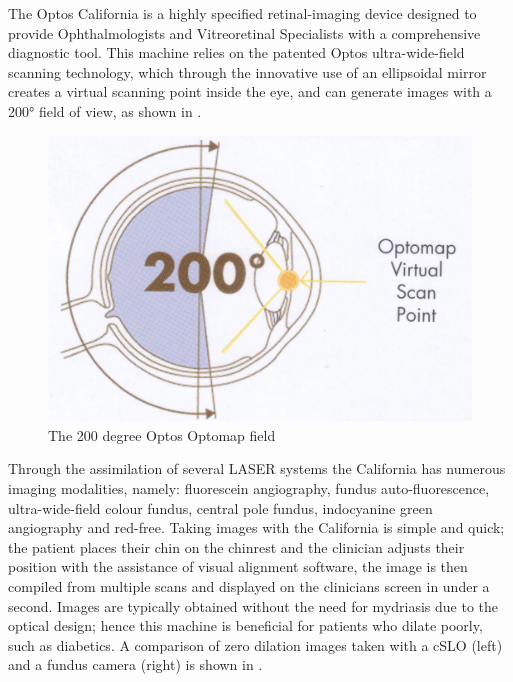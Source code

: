 The Optos California is a highly specified retinal-imaging device designed to provide Ophthalmologists and Vitreoretinal Specialists with a comprehensive diagnostic tool. This machine relies on the patented Optos ultra-wide-field scanning technology, which through the innovative use of an ellipsoidal mirror creates a virtual scanning point inside the eye, and can generate images with a 200° field of view, as shown in .   

\begin{figure}[htbp]
\centering
  \includegraphics{figures/optoswide}
\caption{The 200 degree Optos Optomap field}
\label{fig:wideview}
     \end{figure}

Through the assimilation of several LASER systems the California has numerous imaging modalities, namely: fluorescein angiography, fundus auto-fluorescence, ultra-wide-field colour fundus, central pole fundus, indocyanine green angiography and red-free. Taking images with the California is simple and quick; the patient places their chin on the chinrest and the clinician adjusts their position with the assistance of visual alignment software, the image is then compiled from multiple scans and displayed on the clinicians screen in under a second. Images are typically obtained without the need for mydriasis due to the optical design; hence this machine is beneficial for patients who dilate poorly, such as diabetics. A comparison of zero dilation images taken with a cSLO (left) and a fundus camera (right) is shown in .   


